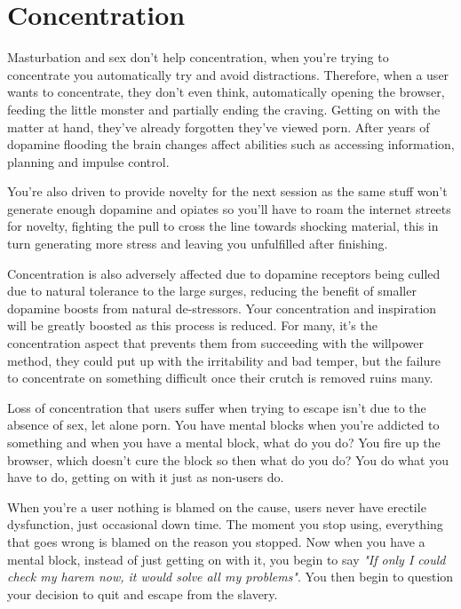 \documentclass[easypeasy.tex]{subfiles}
\begin{document}
\section{Concentration}

Masturbation and sex don't help concentration, when you're trying to concentrate you automatically try and avoid distractions. Therefore, when a user wants to concentrate, they don't even think, automatically opening the browser, feeding the little monster and partially ending the craving. Getting on with the matter at hand, they've already forgotten they've viewed porn. After years of dopamine flooding the brain changes affect abilities such as accessing information, planning and impulse control.

You're also driven to provide novelty for the next session as the same stuff won't generate enough dopamine and opiates so you'll have to roam the internet streets for novelty, fighting the pull to cross the line towards shocking material, this in turn generating more stress and leaving you unfulfilled after finishing.

Concentration is also adversely affected due to dopamine receptors being culled due to natural tolerance to the large surges, reducing the benefit of smaller dopamine boosts from natural de-stressors. Your concentration and inspiration will be greatly boosted as this process is reduced. For many, it's the concentration aspect that prevents them from succeeding with the willpower method, they could put up with the irritability and bad temper, but the failure to concentrate on something difficult once their crutch is removed ruins many.

Loss of concentration that users suffer when trying to escape isn't due to the absence of sex, let alone porn. You have mental blocks when you're addicted to something and when you have a mental block, what do you do? You fire up the browser, which doesn't cure the block so then what do you do? You do what you have to do, getting on with it just as non-users do.

When you're a user nothing is blamed on the cause, users never have erectile dysfunction, just occasional down time. The moment you stop using, everything that goes wrong is blamed on the reason you stopped. Now when you have a mental block, instead of just getting on with it, you begin to say \textit{"If only I could check my harem now, it would solve all my problems"}. You then begin to question your decision to quit and escape from the slavery.
\end{document}
